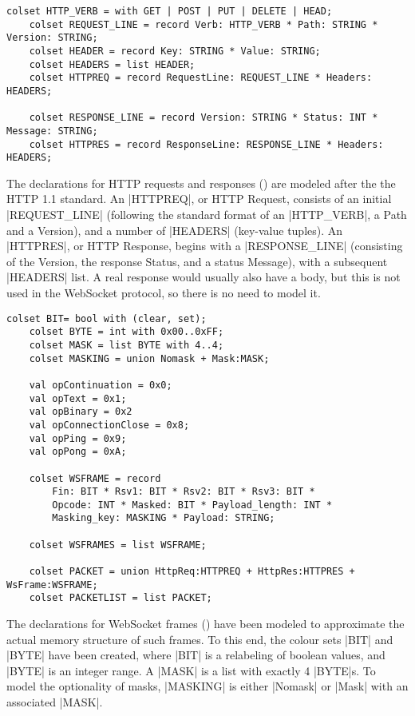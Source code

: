 	\begin{lstlisting}[label=lst:client_lib_colset_http,caption=Library colour
	sets - HTTP,gobble=1]
	colset HTTP_VERB = with GET | POST | PUT | DELETE | HEAD;
	colset REQUEST_LINE = record Verb: HTTP_VERB * Path: STRING * Version: STRING;
	colset HEADER = record Key: STRING * Value: STRING;
	colset HEADERS = list HEADER;
	colset HTTPREQ = record RequestLine: REQUEST_LINE *	Headers: HEADERS;
	
	colset RESPONSE_LINE = record Version: STRING * Status: INT * Message: STRING;
	colset HTTPRES = record ResponseLine: RESPONSE_LINE * Headers: HEADERS;
	\end{lstlisting}
	
	The declarations for HTTP requests and responses
	() are modeled after the  the HTTP 1.1
	standard. An |HTTPREQ|, or HTTP Request, consists of an initial |REQUEST_LINE|
	(following the standard format of an |HTTP_VERB|, a Path and a Version), and a
	number of |HEADERS| (key-value tuples).
	An |HTTPRES|, or HTTP Response, begins with a |RESPONSE_LINE| (consisting of
	the Version, the response Status, and a status Message), with a subsequent
	|HEADERS| list. A real response would usually also have a body, but this is not
	used in the WebSocket protocol, so there is no need to model it.
	
	\begin{lstlisting}[label=lst:client_lib_colset_ws,caption=Library colour
	sets - WebSocket,gobble=1]
	colset BIT= bool with (clear, set);
	colset BYTE = int with 0x00..0xFF;
	colset MASK = list BYTE with 4..4;
	colset MASKING = union Nomask + Mask:MASK;
	
	val opContinuation = 0x0;
	val opText = 0x1;
	val opBinary = 0x2
	val opConnectionClose = 0x8;
	val opPing = 0x9;
	val opPong = 0xA;
	
	colset WSFRAME = record
		Fin: BIT * Rsv1: BIT * Rsv2: BIT * Rsv3: BIT * 
		Opcode: INT * Masked: BIT * Payload_length: INT * 
		Masking_key: MASKING * Payload: STRING;
	
	colset WSFRAMES = list WSFRAME;
	
	colset PACKET = union HttpReq:HTTPREQ + HttpRes:HTTPRES + WsFrame:WSFRAME;
	colset PACKETLIST = list PACKET;
	\end{lstlisting}
	
	The declarations for WebSocket frames () have
	been modeled to approximate the actual memory structure of such frames. To this
	end, the colour sets |BIT| and |BYTE| have been created, where |BIT| is a
	relabeling of boolean values, and |BYTE| is an integer range. A |MASK| is a
	list with exactly 4 |BYTE|s. To model the optionality of masks, |MASKING| is
	either |Nomask| or |Mask| with an associated |MASK|.
	
